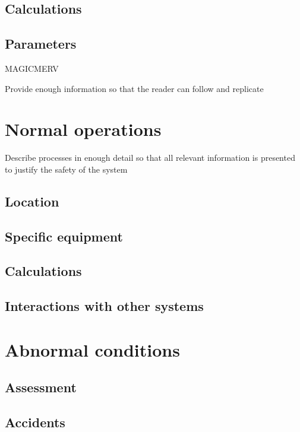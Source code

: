 \documentclass[11pt,a4paper]{article}
\begin{document}
\subsection{Calculations}

\subsection{Parameters}
MAGICMERV

Provide enough information so that the reader can follow and replicate

\newpage

\section{Normal operations}
Describe processes in enough detail so that all relevant information is presented to justify the safety of the system

\subsection{Location}

\subsection{Specific equipment}

\subsection{Calculations}

\subsection{Interactions with other systems}

\newpage

\section{Abnormal conditions}

\subsection{Assessment}

\subsection{Accidents}
\end{document}
